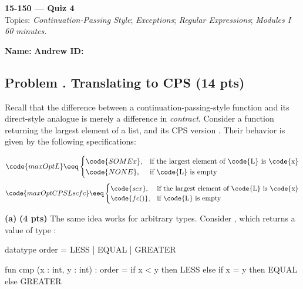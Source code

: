 \documentclass[crop=false]{standalone}
\newif\ifsol
\newcommand{\quizproblem}[3]{%
  \needspace{5\baselineskip}%
  \stepcounter{problem}%
  \ifsol
    \subsection*{Problem \arabic{problem}. #1 \hfill \timing{#2} \quad (#3 pts)}%
  \else
    \subsection*{Problem \arabic{problem}. #1 \hfill (#3 pts)}%
  \fi
}
\newcommand{\subpts}[1]{\textbf{(#1 pts)}}
\begin{document}
\begin{center}
  {\Large \textbf{15-150 --- Quiz 4}} \\
  \vspace{4pt}
  Topics: \textit{Continuation-Passing Style}; \textit{Exceptions};
  \textit{Regular Expressions}; \textit{Modules I} \\
  \vspace{4pt}
  \textit{60 minutes.}
\end{center}

\vspace{1em}

\noindent\textbf{Name:} \hrulefill \hspace{2em} \textbf{Andrew ID:} \hrulefill

\vspace{1em}


\quizproblem{Translating to CPS}{14}{14}

Recall that the difference between a continuation-passing-style function and
its direct-style analogue is merely a difference in \emph{contract}. Consider a
function  returning the largest
element of a list, and its CPS version
. Their
behavior is given by the following specifications:

\[
  \code{maxOpt L} \eeq
  \begin{cases}
    \code{SOME x}, & \text{if the largest element of \code{L} is \code{x}} \\
    \code{NONE},   & \text{if \code{L} is empty}
  \end{cases}
\]
\[
  \code{maxOptCPS L sc fc} \eeq
  \begin{cases}
    \code{sc x},  & \text{if the largest element of \code{L} is \code{x}} \\
    \code{fc ()}, & \text{if \code{L} is empty}
  \end{cases}
\]

\vspace{0.5em}

\textbf{(a)} \subpts{4} The same idea works for arbitrary types.
Consider , which returns a value of type :

\begin{codeblock}
  datatype order = LESS | EQUAL | GREATER

  fun cmp (x : int, y : int) : order =
    if x < y then LESS
    else if x = y then EQUAL
    else GREATER
\end{codeblock}
\end{document}

